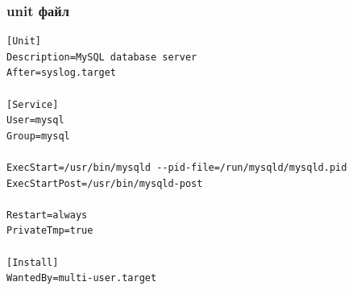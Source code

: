 \documentclass[aspectratio=169]{beamer}
\begin{document}
\begin{frame}[fragile]
  \frametitle{unit файл}

  \begin{lstlisting}[caption=/usr/lib/systemd/system/mysqld.service]
[Unit]
Description=MySQL database server
After=syslog.target

[Service]
User=mysql
Group=mysql

ExecStart=/usr/bin/mysqld --pid-file=/run/mysqld/mysqld.pid 
ExecStartPost=/usr/bin/mysqld-post

Restart=always
PrivateTmp=true

[Install]
WantedBy=multi-user.target
  \end{lstlisting}

\end{frame}
\end{document}
